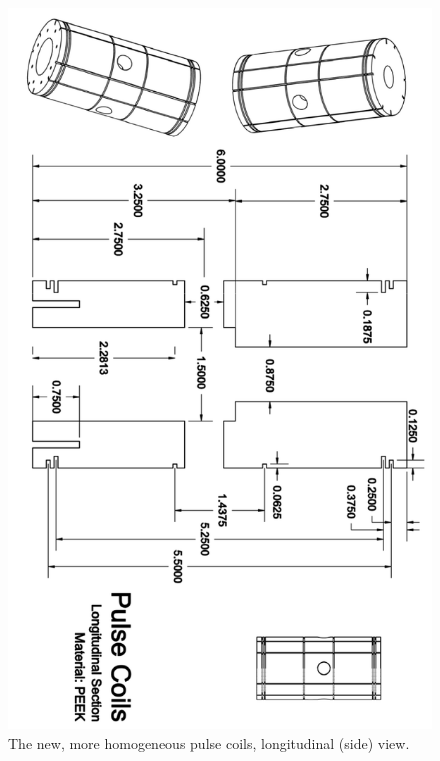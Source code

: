 \documentclass[../PaulGanssle-Thesis.tex]{subfiles}
\begin{document}
\begin{figure}[p]
\centering
\includegraphics[height=0.95\textheight]{appendices/blueprints/PulseCoils01.png}
\caption{The new, more homogeneous pulse coils, longitudinal (side) view.}
\label{blueprints:NewPulseCoils01}

\end{figure}
\end{document}
